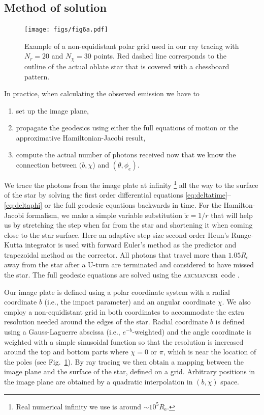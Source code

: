 \documentclass{aa}
\begin{document}
\subsection{Method of solution}\label{sect:num_methods}


\begin{figure}
\centering
\texttt{[image: figs/fig6a.pdf]}
\caption{\label{fig:grid}
Example of a non-equidistant polar grid used in our ray tracing with $N_r = 20$ and $N_{\chi} = 30$ points.
    Red dashed line corresponds to the outline of the actual oblate star that is covered with a chessboard pattern.
}
\end{figure}

In practice, when calculating the observed emission we have to 
\begin{enumerate}
    \item set up the image plane, 
    \item propagate the geodesics using either the full equations of motion or the approximative Hamiltonian-Jacobi result, 
    \item compute the actual number of photons received now that we know the connection between $(b,\chi$) and $(\theta, \phi_e)$.
\end{enumerate}

We trace the photons from the image plate at infinity%
\footnote{Real numerical infinity we use is around $\sim 10^5 R_{\mathrm{e}}$.}
all the way to the surface of the star by solving the first order
differential equations \eqref{eq:deltatime}--\eqref{eq:deltaphi} or the full geodesic equations backwards in time.  
For the Hamilton-Jacobi formalism, we make a simple variable substitution $\tilde{x} = 1/r$
 that will help us by stretching the step when
far from the star and shortening it when coming close to the star
surface.  Here an adaptive step size second order Heun's Runge-Kutta
integrator is used with forward Euler's method as
the predictor and trapezoidal method as the corrector.  
All photons that travel more than $1.05 R_{\mathrm{e}}$ away from the star after a U-turn are
terminated and considered to have missed the star.
The full geodesic equations are solved using the \textsc{arcmancer} code \citep[see][and the related equations therein]{PRJ16}.

Our image plate is defined using a polar coordinate system with a radial
coordinate $b$ (i.e., the impact parameter) and an angular coordinate $\chi$.
We also employ a non-equidistant grid in both coordinates to accommodate
the extra resolution needed around the edges of the star.  Radial
coordinate $b$ is defined using a Gauss-Laguerre abscissa (i.e.,
$e^{-b}$-weighted) and the angle coordinate is weighted with a simple
sinusoidal function so that the resolution is increased around the top
and bottom parts where $\chi = 0$ or $\pi$, which is near the location of the poles
(see Fig.~\ref{fig:grid}).  By ray tracing we then obtain
a mapping between the image plane and the surface of the star, defined
on a grid.
Arbitrary positions in the image plane are obtained by a quadratic interpolation in $(b, \chi)$ space.
\end{document}
